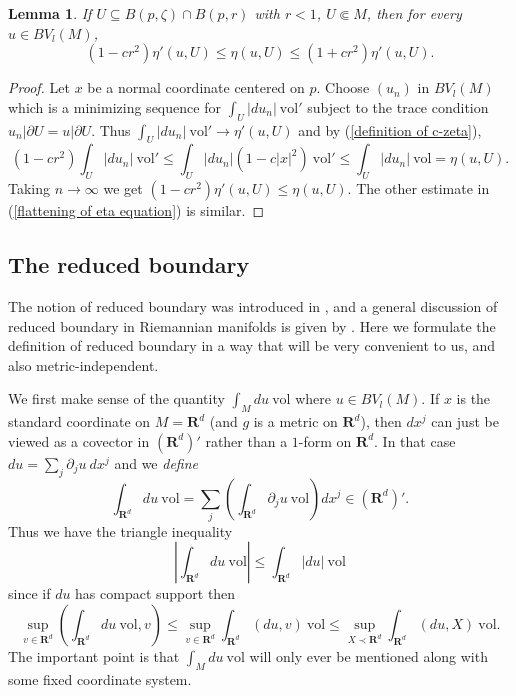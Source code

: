 \documentclass[reqno,12pt,letterpaper]{amsart}
\newcommand{\RR}{\mathbf{R}}
\newcommand{\vol}{\mathrm{vol}}
\newtheorem{lemma}[theorem]{Lemma}
\theoremstyle{definition}
\numberwithin{equation}{section}
\begin{document}
\begin{lemma}\label{flattening of eta}
If $U \subseteq B(p, \zeta) \cap B(p, r)$ with $r < 1$, $U \Subset M$, then for every $u \in BV_l(M)$,
\begin{equation}\label{flattening of eta equation}
(1 - cr^2) \eta'(u, U) \leq \eta(u, U) \leq (1 + cr^2) \eta'(u, U).
\end{equation}
\end{lemma}
\begin{proof}
Let $x$ be a normal coordinate centered on $p$.
Choose $(u_n)$ in $BV_l(M)$ which is a minimizing sequence for $\int_U |du_n| ~\vol'$ subject to the trace condition $u_n|\partial U = u|\partial U$.
Thus $\int_U |du_n| ~\vol' \to \eta'(u, U)$ and by (\ref{definition of c-zeta}),
$$(1 - cr^2) \int_U |du_n| ~\vol' \leq \int_U |du_n| (1 - c|x|^2) ~\vol' \leq \int_U |du_n| ~\vol = \eta(u, U).$$
Taking $n \to \infty$ we get $(1 - cr^2) \eta'(u, U) \leq \eta(u, U)$.
The other estimate in (\ref{flattening of eta equation}) is similar.
\end{proof}


\subsection{The reduced boundary}\label{reduced boundary}
The notion of reduced boundary was introduced in \cite{deGiorgi55}, and a general discussion of reduced boundary in Riemannian manifolds is given by \cite{Battista_2021}.
Here we formulate the definition of reduced boundary in a way that will be very convenient to us, and also metric-independent.

We first make sense of the quantity $\int_M du ~\vol$ where $u \in BV_l(M)$.
If $x$ is the standard coordinate on $M = \RR^d$ (and $g$ is a metric on $\RR^d$), then $dx^j$ can just be viewed as a covector in $(\RR^d)'$ rather than a $1$-form on $\RR^d$.
In that case $du = \sum_j \partial_ju ~dx^j$ and we \emph{define}
$$\int_{\RR^d} du ~\vol = \sum_j \left(\int_{\RR^d} \partial_ju ~\vol \right) dx^j \in (\RR^d)'.$$
Thus we have the triangle inequality
\begin{equation}\label{connection triangle inequality}
\left|\int_{\RR^d} du ~\vol\right| \leq \int_{\RR^d} |du| ~\vol
\end{equation}
since if $du$ has compact support then
$$\sup_{v \in \RR^d} \left(\int_{\RR^d} du ~\vol, v\right) \leq \sup_{v \in \RR^d} \int_{\RR^d} (du, v) ~\vol \leq \sup_{X \prec \RR^d} \int_{\RR^d} (du, X) ~\vol.$$
The important point is that $\int_M du ~\vol$ will only ever be mentioned along with some fixed coordinate system.
\end{document}
